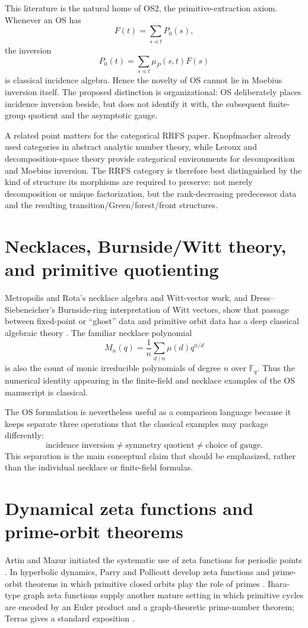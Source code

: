 \documentclass[11pt]{article}
\newcommand{\FF}{\mathbb F}
\begin{document}
This literature is the natural home of OS2, the primitive-extraction axiom. Whenever an OS has
\[
 F(t)=\sum_{s\preceq t}P_0(s),
\]
the inversion
\[
 P_0(t)=\sum_{s\preceq t}\mu_P(s,t)F(s)
\]
is classical incidence algebra. Hence the novelty of OS cannot lie in Moebius inversion itself. The proposed distinction is organizational: OS deliberately places incidence inversion beside, but does not identify it with, the subsequent finite-group quotient and the asymptotic gauge.

A related point matters for the categorical RRFS paper. Knopfmacher already used categories in abstract analytic number theory, while Leroux and decomposition-space theory provide categorical environments for decomposition and Moebius inversion. The RRFS category is therefore best distinguished by the kind of structure its morphisms are required to preserve: not merely decomposition or unique factorization, but the rank-decreasing predecessor data and the resulting transition/Green/forest/front structures.

\section{Necklaces, Burnside/Witt theory, and primitive quotienting}
Metropolis and Rota's necklace algebra and Witt-vector work, and Dress--Siebeneicher's Burnside-ring interpretation of Witt vectors, show that passage between fixed-point or ``ghost'' data and primitive orbit data has a deep classical algebraic theory \cite{MetropolisRota1983,DressSiebeneicher1988}. The familiar necklace polynomial
\[
 M_n(q)=\frac1n\sum_{d\mid n}\mu(d)q^{n/d}
\]
is also the count of monic irreducible polynomials of degree $n$ over $\FF_q$. Thus the numerical identity appearing in the finite-field and necklace examples of the OS manuscript is classical.

The OS formulation is nevertheless useful as a comparison language because it keeps separate three operations that the classical examples may package differently:
\[
 \text{incidence inversion}\neq\text{symmetry quotient}\neq\text{choice of gauge}.
\]
This separation is the main conceptual claim that should be emphasized, rather than the individual necklace or finite-field formulas.

\section{Dynamical zeta functions and prime-orbit theorems}
Artin and Mazur initiated the systematic use of zeta functions for periodic points \cite{ArtinMazur1965}. In hyperbolic dynamics, Parry and Pollicott develop zeta functions and prime-orbit theorems in which primitive closed orbits play the role of primes \cite{ParryPollicott1990}. Ihara-type graph zeta functions supply another mature setting in which primitive cycles are encoded by an Euler product and a graph-theoretic prime-number theorem; Terras gives a standard exposition \cite{Terras2010}.
\end{document}
